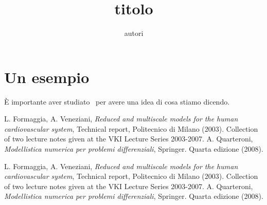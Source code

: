 \documentclass{article}
\title{titolo}
\author{autori}
\begin{document}
\maketitle

\tableofcontents

\section{Un esempio}

\`E importante aver studiato~\cite[Cap.~2]{quarteroni} per avere una idea di cosa stiamo dicendo.


\begin{thebibliography}{9}
    L. Formaggia, A. Veneziani, \emph{Reduced and multiscale models for the human cardiovascular system},
    Technical report, Politecnico di Milano (2003).
    Collection of two lecture notes given at the VKI Lecture Series 2003-2007.
    A. Quarteroni, \emph{Modellistica numerica per problemi differenziali},
    Springer. Quarta edizione (2008).
\end{thebibliography}
\newpage
\begin{thebibliography}{For.Ven. 2003}
    	L. Formaggia, A. Veneziani, \emph{Reduced and multiscale models for the human cardiovascular system},
        Technical report, Politecnico di Milano (2003).
        Collection of two lecture notes given at the VKI Lecture Series 2003-2007.
    	A. Quarteroni, \emph{Modellistica numerica per problemi differenziali},
        Springer. Quarta edizione (2008).
\end{thebibliography}
\end{document}
